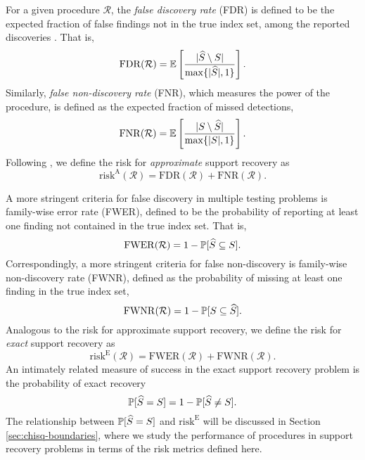 For a given procedure $\mathcal{R}$, the \emph{false discovery rate} (FDR) is defined to be the expected fraction of false findings not in the true index set, among the reported discoveries \cite{benjamini1995controlling}. That is,
\begin{equation} \label{eq:FDR}
    \mathrm{FDR}(\mathcal{R}) = \E\left[\frac{|\widehat{S}\setminus S|}{\max\{|\widehat{S}|,1\}}\right].
\end{equation}
Similarly, \emph{false non-discovery rate} (FNR), which measures the power of the procedure, is defined as the expected fraction of missed detections,
\begin{equation} \label{eq:FNR}
    \mathrm{FNR}(\mathcal{R}) = \E\left[\frac{|S\setminus \widehat{S}|}{\max\{|{S}|,1\}}\right].
\end{equation}
Following \cite{arias2017distribution, rabinovich2017optimal}, we define the risk for \emph{approximate} support recovery as
\begin{equation} \label{eq:risk-approximate}
    \mathrm{risk}^{\mathrm{A}}(\mathcal{R}) = \mathrm{FDR}(\mathcal{R}) + \mathrm{FNR}(\mathcal{R}).
\end{equation}

A more stringent criteria for false discovery in multiple testing problems is family-wise error rate (FWER), defined to be the probability of reporting at least one finding not contained in the true index set.
That is,
\begin{equation} \label{eq:FWER}
    \mathrm{FWER}(\mathcal{R}) = 1 - \P[\widehat{S} \subseteq S].
\end{equation}
Correspondingly, a more stringent criteria for false non-discovery is family-wise non-discovery rate (FWNR), defined as the probability of missing at least one finding in the true index set,
\begin{equation} \label{eq:FWNDR}
    \mathrm{FWNR}(\mathcal{R}) = 1 - \P[S \subseteq \widehat{S}].
\end{equation}
Analogous to the risk for approximate support recovery, we define the risk for \emph{exact} support recovery as
\begin{equation} \label{eq:risk-exact}
    \mathrm{risk}^{\mathrm{E}}(\mathcal{R}) = \mathrm{FWER}(\mathcal{R}) + \mathrm{FWNR}(\mathcal{R}).
\end{equation}
An intimately related measure of success in the exact support recovery problem is the probability of exact recovery 
\begin{equation} \label{eq:risk-prob}
    \P[\widehat{S} = S] = 1 - \P[\widehat{S} \neq S].
\end{equation}
The relationship between $\P[\widehat{S} = S]$ and $\mathrm{risk}^{\mathrm{E}}$ will be discussed in Section \ref{sec:chisq-boundaries}, where we study the performance of procedures in support recovery problems in terms of the risk metrics defined here.

